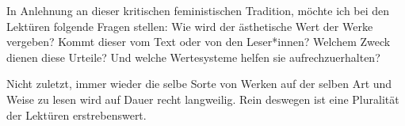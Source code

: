 In Anlehnung an dieser kritischen feministischen Tradition, möchte ich bei den Lektüren folgende Fragen stellen: Wie wird der ästhetische Wert der Werke vergeben? Kommt dieser vom Text oder von den Leser*innen? 
Welchem Zweck dienen diese Urteile?
Und welche Wertesysteme helfen sie aufrechzuerhalten?

Nicht zuletzt, immer wieder die selbe Sorte von Werken auf der selben Art und Weise zu lesen wird auf Dauer recht langweilig.
Rein deswegen ist eine Pluralität der Lektüren erstrebenswert.

\begin{comment}
feminist criticism very quickly moved
beyond merely "expos[ing] sexism in one work of literature after
another"\cite{Kolodny1980}
--> Tu ich das? Merely exposing sexism in one work of literature? Ist es ok? mach ich vlt sonst was anderes?
\end{comment}
